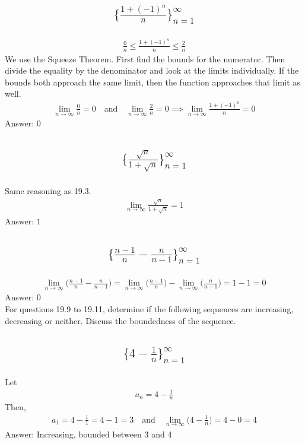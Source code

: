 \documentclass{article}
\begin{document}
\subsection{
	\begin{align*}
		\biggl\{ \frac{1+(-1)^n}{n} \biggl\}_{n=1}^\infty
	\end{align*}
}
\begin{align*}
	\frac{0}{n} \leq \frac{1+(-1)^n}{n} \leq \frac{2}{n}
\end{align*}
We use the Squeeze Theorem. First find the bounds for the numerator. Then divide the equality by the denominator and look at the limits individually. If the bounds both approach the same limit, then the function approaches that limit as well. 
\begin{align*}
	\lim_{n \to \infty} \frac{0}{n} = 0 \quad \text{and} \quad \lim_{n \to \infty} \frac{2}{n} = 0 \implies \lim_{n \to \infty} \frac{1+(-1)^n}{n} = 0
\end{align*}
Answer: $0$

\subsection{
	\begin{align*}
		\biggl\{ \frac{\sqrt{n}}{1 + \sqrt{n}} \biggl\}_{n=1}^\infty
	\end{align*}
}
Same reasoning as 19.3.
\begin{align*}
	\lim_{n \to \infty} \frac{\sqrt{n}}{1 + \sqrt{n}} = 1
\end{align*}
Answer: $1$

\subsection{
	\begin{align*}
		\biggl\{ \frac{n - 1}{n} - \frac{n}{n - 1} \biggl\}_{n=1}^\infty
	\end{align*}
}
\begin{align*}
	\lim_{n \to \infty} \bigg( \frac{n - 1}{n} - \frac{n}{n - 1} \bigg) = \lim_{n \to \infty} \bigg( \frac{n - 1}{n} \bigg) - \lim_{n \to \infty} \bigg( \frac{n}{n - 1} \bigg) = 1 - 1 = 0
\end{align*}
Answer: $0$
\\[10pt]
For questions 19.9 to 19.11, determine if the following sequences are increasing, decreasing or neither. Discuss the boundedness of the sequence.

\subsection{
	\begin{align*}
		\biggl\{ 4 - \frac{1}{n} \biggl\}_{n=1}^\infty
	\end{align*}
}
Let
\begin{align*}
	a_n = 4 - \frac{1}{n}
\end{align*}
Then,
\begin{align*}
	a_1 = 4 - \frac{1}{1} = 4 - 1 = 3 \quad \text{and} \quad \lim_{n \to \infty} \bigg( 4 - \frac{1}{n} \bigg) = 4 - 0 = 4
\end{align*}
Answer: Increasing, bounded between 3 and 4
\end{document}
